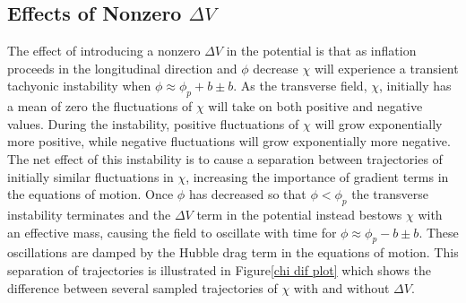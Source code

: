 \documentclass[letterpaper,11pt]{article}
\begin{document}


\subsection{Effects of Nonzero $\Delta V$}
The effect of introducing a nonzero $\Delta V$ in the potential is that as inflation proceeds in the longitudinal direction and $\phi$ decrease $\chi$ will experience a transient tachyonic instability when $\phi \approx \phi_p+b \pm b$. As the transverse field, $\chi$, initially has a mean of zero the fluctuations of $\chi$ will take on both positive and negative values. During the instability, positive fluctuations of $\chi$ will grow exponentially more positive, while negative fluctuations will grow exponentially more negative. The net effect of this instability is to cause a separation between trajectories of initially similar fluctuations in $\chi$, increasing the importance of gradient terms in the equations of motion. Once $\phi$ has decreased so that $\phi < \phi_p$ the transverse instability terminates and the $\Delta V$ term in the potential instead bestows $\chi$ with an effective mass, causing the field to oscillate with time for $\phi \approx \phi_p-b \pm b$. These oscillations are damped by the Hubble drag term in the equations of motion. This separation of trajectories is illustrated in Figure\ref{chi dif plot} which shows the difference between several sampled trajectories of $\chi$ with and without $\Delta V$.
\end{document}
